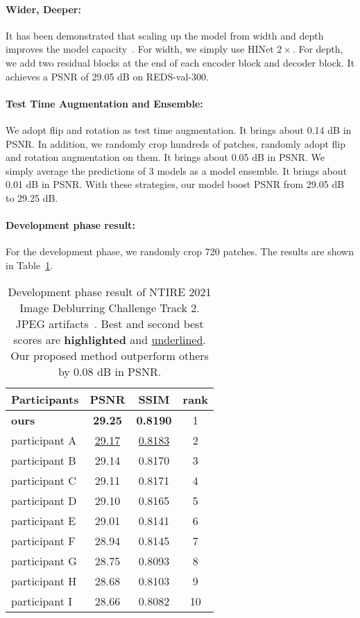 \documentclass[final]{cvpr}
\newcommand{\tablestyle}[2]{\setlength{\tabcolsep}{#1}\renewcommand{\arraystretch}{#2}\centering\footnotesize}
\begin{document}
\paragraph{Wider, Deeper:} 
It has been demonstrated that scaling up the model from width and depth improves the model capacity~\cite{tan2019efficientnet,yu2018wide}. For width, we simply use HINet $2\times$. For depth, we add two residual blocks at the end of each encoder block and decoder block.
It achieves a PSNR of 29.05 dB on REDS-val-300.

\paragraph{Test Time Augmentation and Ensemble:}
We adopt flip and rotation as test time augmentation. It brings about 0.14 dB in PSNR. In addition, we randomly crop hundreds of patches, randomly adopt flip and rotation augmentation on them. It brings about 0.05 dB in PSNR. We simply average the predictions of 3 models as a model ensemble. It brings about 0.01 dB in PSNR. With these strategies, our model boost PSNR from 29.05 dB to 29.25 dB.

\paragraph{Development phase result:}
For the development phase, we randomly crop 720 patches. The results are shown in Table~\ref{result.devphase}.

\begin{table}[]
    \centering
    \tablestyle{5pt}{1.05}\setlength{\tabcolsep}{1.mm}\begin{tabular}{l|ccc}
    Participants & PSNR & SSIM & rank\\
    \hline
        \textbf{ours} & \textbf{29.25} & \textbf{0.8190} & 1 \\
         participant A & \underline{29.17} & \underline{0.8183} & 2\\
         participant B & 29.14 & 0.8170 & 3\\
         participant C & 29.11 & 0.8171 & 4\\
         participant D & 29.10 & 0.8165 & 5\\
         participant E & 29.01 & 0.8141 & 6\\
         participant F & 28.94 & 0.8145 & 7\\
         participant G & 28.75 & 0.8093 & 8\\
         participant H & 28.68 & 0.8103 & 9\\
         participant I & 28.66 & 0.8082 & 10\\
    \end{tabular}
    \vspace{-0.1cm}
    \caption{Development phase result of NTIRE 2021 Image Deblurring Challenge Track 2. JPEG artifacts~\cite{nah2021ntire}. Best and second best scores are \textbf{highlighted} and \underline{underlined}. Our proposed method outperform others by 0.08 dB in PSNR.}
    \label{result.devphase}
\end{table}
\end{document}
